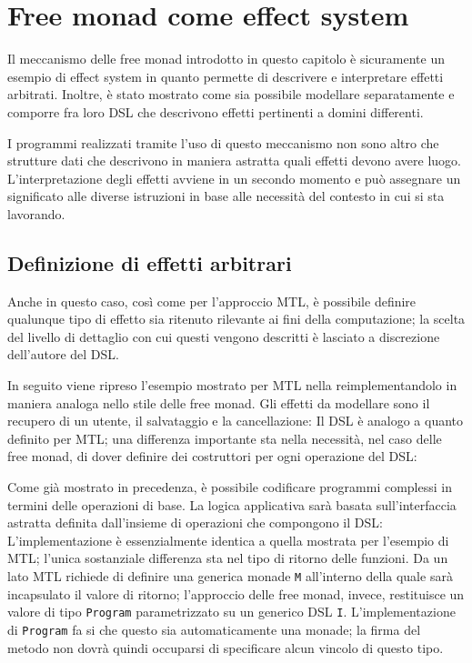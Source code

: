 \section{Free monad come effect system}
Il meccanismo delle free monad introdotto in questo capitolo è sicuramente un esempio di effect system in quanto permette di descrivere e interpretare effetti arbitrati. Inoltre, è stato mostrato come sia possibile modellare separatamente e comporre fra loro DSL che descrivono effetti pertinenti a domini differenti.

I programmi realizzati tramite l'uso di questo meccanismo non sono altro che strutture dati che descrivono in maniera astratta quali effetti devono avere luogo. L'interpretazione degli effetti avviene in un secondo momento e può assegnare un significato alle diverse istruzioni in base alle necessità del contesto in cui si sta lavorando.

\subsection{Definizione di effetti arbitrari}
Anche in questo caso, così come per l'approccio MTL, è possibile definire qualunque tipo di effetto sia ritenuto rilevante ai fini della computazione; la scelta del livello di dettaglio con cui questi vengono descritti è lasciato a discrezione dell'autore del DSL.

In seguito viene ripreso l'esempio mostrato per MTL nella  reimplementandolo in maniera analoga nello stile delle free monad. Gli effetti da modellare sono il recupero di un utente, il salvataggio e la cancellazione:
Il DSL è analogo a quanto definito per MTL; una differenza importante sta nella necessità, nel caso delle free monad, di dover definire dei costruttori per ogni operazione del DSL:

Come già mostrato in precedenza, è possibile codificare programmi complessi in termini delle operazioni di base. La logica applicativa sarà basata sull'interfaccia astratta definita dall'insieme di operazioni che compongono il DSL:
L'implementazione è essenzialmente identica a quella mostrata per l'esempio di MTL; l'unica sostanziale differenza sta nel tipo di ritorno delle funzioni. Da un lato MTL richiede di definire una generica monade \lstinline{M} all'interno della quale sarà incapsulato il valore di ritorno; l'approccio delle free monad, invece, restituisce un valore di tipo \lstinline{Program} parametrizzato su un generico DSL \lstinline{I}.
L'implementazione di \lstinline{Program} fa si che questo sia automaticamente una monade; la firma del metodo non dovrà quindi occuparsi di specificare alcun vincolo di questo tipo.

